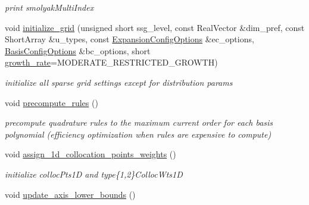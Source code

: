 \begin{DoxyCompactItemize}
\begin{DoxyCompactList}\small\item\em print smolyak\+Multi\+Index \end{DoxyCompactList}\item 
void \hyperlink{classPecos_1_1SparseGridDriver_a3b578f2e45db98ee464a116f6e8c7141}{initialize\+\_\+grid} (unsigned short ssg\+\_\+level, const Real\+Vector \&dim\+\_\+pref, const Short\+Array \&u\+\_\+types, const \hyperlink{classPecos_1_1ExpansionConfigOptions}{Expansion\+Config\+Options} \&ec\+\_\+options, \hyperlink{classPecos_1_1BasisConfigOptions}{Basis\+Config\+Options} \&bc\+\_\+options, short \hyperlink{classPecos_1_1SparseGridDriver_a6f9061513ba25c62ee7a49b0d5da42cc}{growth\+\_\+rate}=M\+O\+D\+E\+R\+A\+T\+E\+\_\+\+R\+E\+S\+T\+R\+I\+C\+T\+E\+D\+\_\+\+G\+R\+O\+W\+TH)\label{classPecos_1_1SparseGridDriver_a3b578f2e45db98ee464a116f6e8c7141}

\begin{DoxyCompactList}\small\item\em initialize all sparse grid settings except for distribution params \end{DoxyCompactList}\item 
void \hyperlink{classPecos_1_1SparseGridDriver_a58abd8ec1505f02f76197f788aa94127}{precompute\+\_\+rules} ()\label{classPecos_1_1SparseGridDriver_a58abd8ec1505f02f76197f788aa94127}

\begin{DoxyCompactList}\small\item\em precompute quadrature rules to the maximum current order for each basis polynomial (efficiency optimization when rules are expensive to compute) \end{DoxyCompactList}\item 
void \hyperlink{classPecos_1_1SparseGridDriver_acedb98205d839c66153cd0818683fb55}{assign\+\_\+1d\+\_\+collocation\+\_\+points\+\_\+weights} ()\label{classPecos_1_1SparseGridDriver_acedb98205d839c66153cd0818683fb55}

\begin{DoxyCompactList}\small\item\em initialize colloc\+Pts1D and type\{1,2\}Colloc\+Wts1D \end{DoxyCompactList}\item 
void \hyperlink{classPecos_1_1SparseGridDriver_a14be60978dad57dbd09ae41f9ce96d27}{update\+\_\+axis\+\_\+lower\+\_\+bounds} ()\label{classPecos_1_1SparseGridDriver_a14be60978dad57dbd09ae41f9ce96d27}


\end{DoxyCompactItemize}
